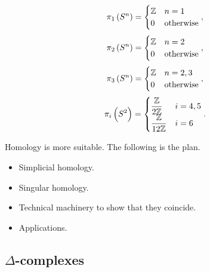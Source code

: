 \begin{example*}
$$ \pi_1\br{S^n} =
\begin{cases}
\Z & n = 1 \\
0 & \text{otherwise}
\end{cases},
$$
$$ \pi_2\br{S^n} =
\begin{cases}
\Z & n = 2 \\
0 & \text{otherwise}
\end{cases},
$$
$$ \pi_3\br{S^n} =
\begin{cases}
\Z & n = 2, 3 \\
0 & \text{otherwise}
\end{cases},
$$
$$ \pi_i\br{S^2} =
\begin{cases}
\dfrac{\Z}{2\Z} & i = 4, 5 \\
\dfrac{\Z}{12\Z} & i = 6
\end{cases}.
$$
\end{example*}

Homology is more suitable. The following is the plan.
\begin{itemize}
\item Simplicial homology.
\item Singular homology.
\item Technical machinery to show that they coincide.
\item Applications.
\end{itemize}

\pagebreak

\subsection{\texorpdfstring{$ \Delta $}{Delta}-complexes}

